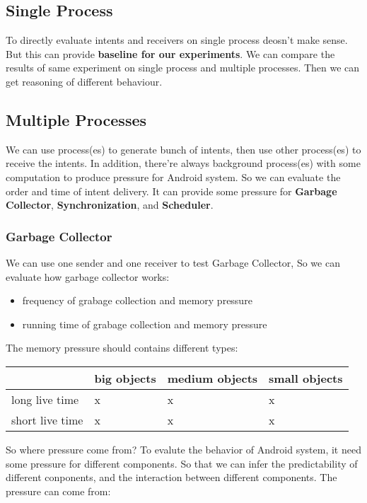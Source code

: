 \documentclass[11pt]{article}
\begin{document}
\subsection{Single Process}
\label{sec-3-1}
To directly evaluate intents and receivers on
single process deosn't make sense.
But this can provide \textbf{baseline for our experiments}.
We can compare the results of same experiment on single process
and multiple processes.
Then we can get reasoning of different behaviour.

\subsection{Multiple Processes}
\label{sec-3-2}
We can use process(es) to generate bunch of intents, then use other
process(es) to receive the intents.
In addition, there're always background process(es) with some computation
to produce pressure for Android system.
So we can evaluate the order and time of intent delivery.
It can provide some pressure for \textbf{Garbage Collector}, \textbf{Synchronization}, and \textbf{Scheduler}.

\subsubsection{Garbage Collector}
\label{sec-3-2-1}
We can use one sender and one receiver to test Garbage Collector,
So we can evaluate how garbage collector works:
\begin{itemize}
\item frequency of grabage collection and memory pressure
\item running time of grabage collection and memory pressure
\end{itemize}

The memory pressure should contains different \label{Memory-Pressure-Types}types:
\begin{center}
\begin{tabular}{l|lll}
 & big objects & medium objects & small objects\\
\hline
long live time & x & x & x\\
short live time & x & x & x\\
\end{tabular}
\end{center}

So where pressure come from?
To evalute the behavior of Android system, it need some pressure for
different components. So that we can infer the predictability of different
conponents, and the interaction between different components.
The pressure can come from:
\end{document}
